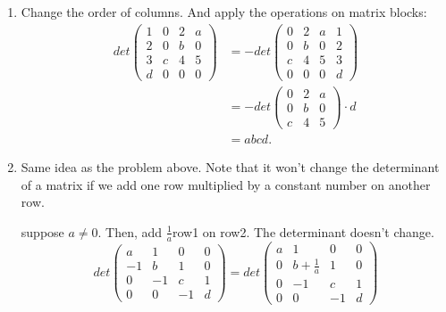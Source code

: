 \documentclass[12pt]{article}
\begin{document}
\begin{enumerate}
\item
Change the order of columns. And apply the operations on matrix blocks:
\begin{equation*}
\begin{aligned}
det
\begin{pmatrix}
1 & 0 & 2 & a\\
2 & 0 & b & 0 \\
3 & c & 4 & 5 \\
d & 0 & 0 & 0
\end{pmatrix}
& = 
- det
\begin{pmatrix}
0 & 2 & a & 1\\
 0 & b & 0 & 2 \\
c & 4 & 5 & 3\\
0 & 0 & 0 & d
\end{pmatrix}
 \\
& = 
-det 
\begin{pmatrix}
0 & 2 & a\\
0 & b & 0 \\
c & 4 & 5
\end{pmatrix}
\cdot d \\
& = abcd.
\end{aligned}
\end{equation*}

\item
Same idea as the problem above. Note that it won't change the determinant of a matrix if we add one row multiplied by a constant number on another row. 

suppose $a\neq 0$. Then, add $\frac{1}{a}$row1 on row2. The determinant doesn't change.
\begin{equation*}
det
\begin{pmatrix}
a & 1 & 0 & 0\\
-1 & b & 1 & 0 \\
0 & -1 & c & 1 \\
0 & 0 & -1 & d
\end{pmatrix}
= 
det
\begin{pmatrix}
a & 1 & 0 & 0\\
0 & b + \frac{1}{a} & 1 & 0 \\
0 & -1 & c & 1 \\
0 & 0 & -1 & d
\end{pmatrix}
\end{equation*}


\end{enumerate}
\end{document}
